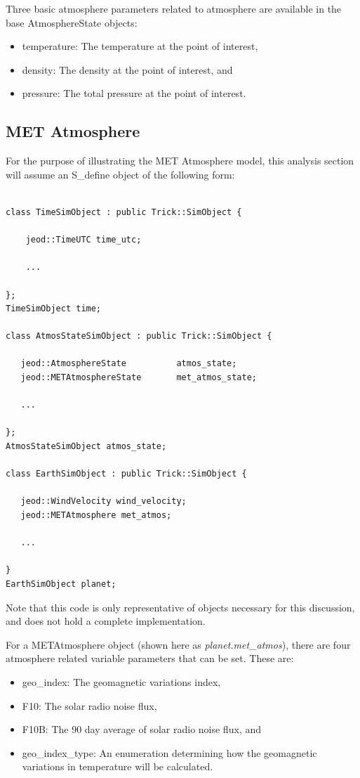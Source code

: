Three basic atmosphere parameters related to atmosphere are available in the
base AtmosphereState objects:

\begin{itemize}
\item temperature: The temperature at the point of interest,
\item density: The density at the point of interest, and
\item pressure: The total pressure at the point of interest.
\end{itemize}

\subsection {MET Atmosphere}
For the purpose of illustrating the MET Atmosphere model, this analysis section
will assume an S\_define object of the following form:

\begin{verbatim}

class TimeSimObject : public Trick::SimObject {

    jeod::TimeUTC time_utc;

    ...

};
TimeSimObject time;

class AtmosStateSimObject : public Trick::SimObject {

   jeod::AtmosphereState          atmos_state;
   jeod::METAtmosphereState       met_atmos_state;

   ...

};
AtmosStateSimObject atmos_state;

class EarthSimObject : public Trick::SimObject {

   jeod::WindVelocity wind_velocity;
   jeod::METAtmosphere met_atmos;

   ...

}
EarthSimObject planet;

\end{verbatim}

Note that this code is only representative of objects
necessary for this discussion,
and does not hold a complete implementation.

For a METAtmosphere object (shown here as \textit{planet.met\_atmos}), there are four
atmosphere related variable parameters that can be set. These are:

\begin{itemize}
\item geo\_index: The geomagnetic variations index,
\item F10: The solar radio noise flux,
\item F10B: The 90 day average of solar radio noise flux, and
\item geo\_index\_type: An enumeration determining how the geomagnetic variations
in temperature will be calculated.
\end{itemize}

